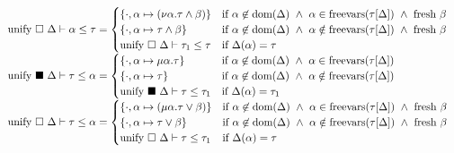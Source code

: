 \documentclass[sigplan,screen]{acmart}
\begin{document}
\begin{figure*}[h]
\[\begin{array}{l @{} l}
      \text{unify } \square\ \Delta \vdash \alpha \leq \tau	
      &{} =
      \begin{cases}  
        \{ \cdot,\alpha \mapsto (\nu\alpha.\tau \wedge \beta) \}
        & \text{if } 
        \alpha \not\in \text{dom}(\Delta) \ \wedge\
        \alpha \in \text{freevars}(\tau[\Delta]) \ \wedge\ 
        \text{fresh } \beta
        \\
        \{ \cdot,\alpha \mapsto \tau \wedge \beta \}
        & \text{if } 
        \alpha \not\in \text{dom}(\Delta) \ \wedge\
        \alpha \notin \text{freevars}(\tau[\Delta]) \ \wedge\ 
        \text{fresh } \beta
        \\
        \text{unify } \square\ \Delta \vdash \tau_1 \leq \tau
        &\text{if }
        \Delta(\alpha) = \tau
      \end{cases}
      \\
      \text{unify } \blacksquare\ \Delta \vdash \tau \leq \alpha 	
      &{} =
      \begin{cases}  
        \{ \cdot,\alpha \mapsto \mu\alpha.\tau \}
        & \text{if } 
        \alpha \not\in \text{dom}(\Delta) \ \wedge\
        \alpha \in \text{freevars}(\tau[\Delta])
        \\
        \{ \cdot,\alpha \mapsto \tau \}
        & \text{if } 
        \alpha \not\in \text{dom}(\Delta) \ \wedge\
        \alpha \notin \text{freevars}(\tau[\Delta])
        \\
        \text{unify } \blacksquare\ \Delta \vdash \tau \leq \tau_1
        &\text{if }
        \Delta(\alpha) = \tau_1
      \end{cases}
      \\
      \text{unify } \square\ \Delta \vdash \tau \leq \alpha	
      &{} =
      \begin{cases}  
        \{ \cdot,\alpha \mapsto (\mu\alpha.\tau \vee \beta) \}
        & \text{if } 
        \alpha \not\in \text{dom}(\Delta) \ \wedge\
        \alpha \in \text{freevars}(\tau[\Delta]) \ \wedge\ 
        \text{fresh } \beta
        \\
        \{ \cdot,\alpha \mapsto \tau \vee \beta \}
        & \text{if } 
        \alpha \not\in \text{dom}(\Delta) \ \wedge\
        \alpha \notin \text{freevars}(\tau[\Delta]) \ \wedge\ 
        \text{fresh } \beta
        \\
        \text{unify } \square\ \Delta \vdash \tau \leq \tau_1
        &\text{if }
        \Delta(\alpha) = \tau
      \end{cases}
      \\

\end{array}\]
\end{figure*}
\end{document}
